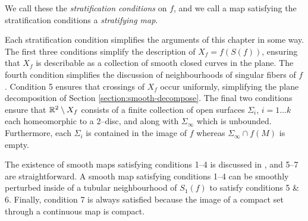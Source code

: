 We call these the \emph{stratification conditions} on $f$, and we call a map satisfying the stratification conditions a \emph{stratifying map}.

Each stratification condition simplifies the arguments of this chapter in some way.
The first three conditions simplify the description of $X_f=f(S(f))$, ensuring that $X_f$ is describable as a collection of smooth closed curves in the plane.
The fourth condition simplifies the discussion of neighbourhoods of singular fibers of $f$.
Condition 5 ensures that crossings of $X_f$ occur uniformly, simplifying the plane decomposition of Section \ref{section:smooth-decompose}.
The final two conditions ensure that $\mathbb{R}^2\setminus X_f$ consists of a finite collection of open surfaces $\Sigma_i$, $i=1\dots k$ each homeomorphic to a 2--disc, and along with $\Sigma_\infty$ which is unbounded.
Furthermore, each $\Sigma_i$ is contained in the image of $f$ whereas $\Sigma_\infty\cap f(M)$ is empty.

The existence of smooth maps satisfying conditions 1--4 is discussed in \cite{Levine65}, and 5--7 are straightforward.
A smooth map satisfying conditions 1--4 can be smoothly perturbed inside of a tubular neighbourhood of $S_1(f)$ to satisfy conditions 5 \& 6.
Finally, condition 7 is always satisfied because the image of a compact set through a continuous map is compact.


